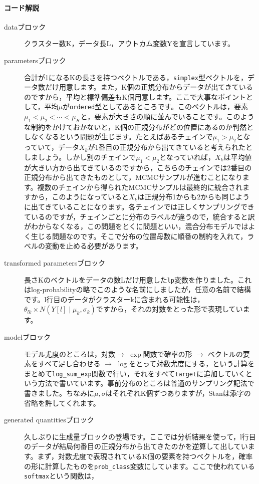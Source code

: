 \documentclass{ltjsbook}
\begin{document}
\paragraph{コード解説}
\begin{description}
	\item[dataブロック] クラスター数K，データ長L，アウトカム変数Yを宣言しています。
	\item[parametersブロック] 合計が1になるKの長さを持つベクトルである，\verb|simplex|型ベクトルを，データ数だけ用意します。また，K個の正規分布からデータが出てきているのですから，平均と標準偏差もK個用意します。ここで大事なポイントとして，平均$\mu$が\verb|ordered|型としてあるところです。このベクトルは，要素$\mu_1<\mu_2<\cdots<\mu_K$と，要素が大きさの順に並んでいることです。このような制約をかけておかないと，K個の正規分布がどの位置にあるのか判然としなくなるという問題が生じます。たとえばあるチェインで$\mu_1>\mu_2$となっていて，データ$X_k$が1番目の正規分布から出てきていると考えられたとしましょう。しかし別のチェインで$\mu_1<\mu_2$となっていれば，$X_k$は平均値が大きい方から出てきているのですから，こちらのチェインでは2番目の正規分布から出てきたものとして，MCMCサンプルが進むことになります。複数のチェインから得られたMCMCサンプルは最終的に統合されますから，このようになっていると$X_k$は正規分布1からも2からも同じように出てきていることになります。各チェインでは正しくサンプリングできているのですが，チェインごとに分布のラベルが違うので，統合すると訳がわからなくなる，この問題をとくに問題といい，混合分布モデルではよく生じる問題なのです。そこで分布の位置母数に順番の制約を入れて，ラベルの変動を止める必要があります。
	\item[transformed parametersブロック] 長さKのベクトルをデータの数Lだけ用意した\verb|lp|変数を作りました。これはlog-probabilityの略でこのような名前にしましたが，任意の名前で結構です。l行目のデータがクラスターkに含まれる可能性は，$\theta_{lk} \times N(Y[l]\mid\mu_k,\sigma_k)$ですから，それの対数をとった形で表現しています。
	\item[modelブロック] モデル尤度のところは，対数$\to$ $\exp$関数で確率の形 $\to$ ベクトルの要素をすべて足し合わせる $\to$ $\log$をとって対数尤度にする，という計算をまとめて\verb|log_sum_exp|関数で行い，それをすべて\verb|target|に追加していくという方法で書いています。事前分布のところは普通のサンプリング記法で書きました。ちなみに$\mu,\sigma$はそれぞれK個ずつありますが，Stanは添字の省略を許してくれます。
	\item[generated quantitiesブロック] 久しぶりに生成量ブロックの登場です。ここでは分析結果を使って，l行目のデータが結局何番目の正規分布から出てきたのかを逆算して出しています。まず，対数尤度で表現されているK個の要素を持つベクトルを，確率の形に計算したものを\verb|prob_class|変数にしています。ここで使われている\verb|softmax|という関数は，

\end{description}
\end{document}

